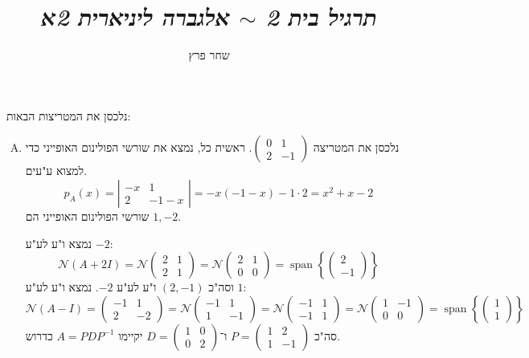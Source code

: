 \documentclass[]{article}
\author{שחר פרץ}
\title{\textit{תרגיל בית 2 $\sim$ אלגברה ליניארית 2א}}
\newcommand\nc    {\mathcal{N}}
\DeclareMathOperator{\Sp}     {span}
\newcommand\pms[1]    {\begin{pmatrix}
		#1
\end{pmatrix}}
\newcommand\detms[1]  {\left\vert\begin{matrix}
		#1
\end{matrix}\right\vert}
\newcommand\op    {^{-1}}
\newcommand\ccb[1]    {\left \{ #1 \right \}}
\theoremstyle{definition}
\begin{document}
	\maketitle
	\section{}
	נלכסן את המטריצות הבאות: 
	\begin{enumerate}[A)]
		\item נלכסן את המטריצה $\pms{0 & 1 \\ 2 & -1}$. ראשית כל, נמצא את שורשי הפולינום האופייני כדי למצוא ע"עים. 
		\[ p_A(x) = \detms{-x & 1 \\ 2 & -1 - x} = -x(-1 - x) - 1 \cdot 2 = x^2 + x - 2 \]
		שורשי הפולינום האופייני הם $1, -2$. 
		
		נמצא ו"ע לע"ע $-2$: 
		\[ \nc (A + 2I) = \nc\pms{2 & 1 \\ 2 & 1} = \nc \pms{2 & 1 \\ 0 & 0} = \Sp\ccb{\pms{2 \\ -1}} \]
		וסה"כ $(2, -1)$ ו"ע לע"ע $-2$. נמצא ו"ע לע"ע $1$: 
		\[ \nc(A - I) = \pms{-1 & 1 \\ 2 & -2} = \nc\pms{-1 & 1 \\ 1 & -1} = \nc\pms{-1 & 1 \\ -1 & 1} = \nc\pms{1 & -1 \\ 0 & 0} = \Sp\ccb{\pms{1 \\ 1}} \]
		סה"כ $P = \pms{1 & 2 \\ 1 & -1}$ ו־$D = \pms{1 & 0 \\ 0 & 2}$ יקיימו $A = PDP\op$ כדרוש. 
		

\end{enumerate}
\end{document}
